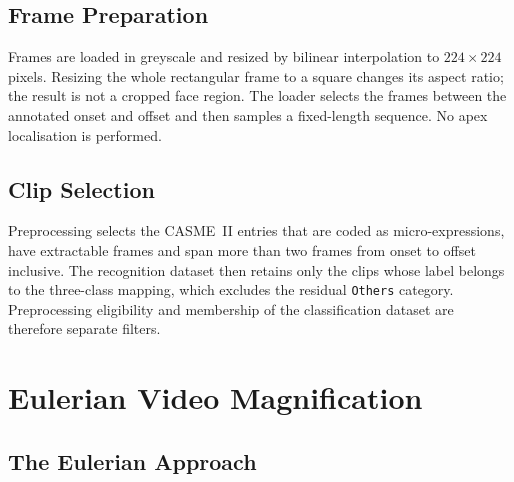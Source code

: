 \subsection{Frame Preparation}
\label{sec:frame-preparation}

Frames are loaded in greyscale and resized by bilinear interpolation to $224\times224$ pixels. Resizing the whole rectangular frame to a square changes its aspect ratio; the result is not a cropped face region. The loader selects the frames between the annotated onset and offset and then samples a fixed-length sequence. No apex localisation is performed.

\subsection{Clip Selection}
\label{sec:clip-selection}

Preprocessing selects the CASME~II entries that are coded as micro-expressions, have extractable frames and span more than two frames from onset to offset inclusive. The recognition dataset then retains only the clips whose label belongs to the three-class mapping, which excludes the residual \texttt{Others} category. Preprocessing eligibility and membership of the classification dataset are therefore separate filters.


\section{Eulerian Video Magnification}
\label{sec:motion-magnification}

\subsection{The Eulerian Approach}
\label{sec:eulerian-idea}

